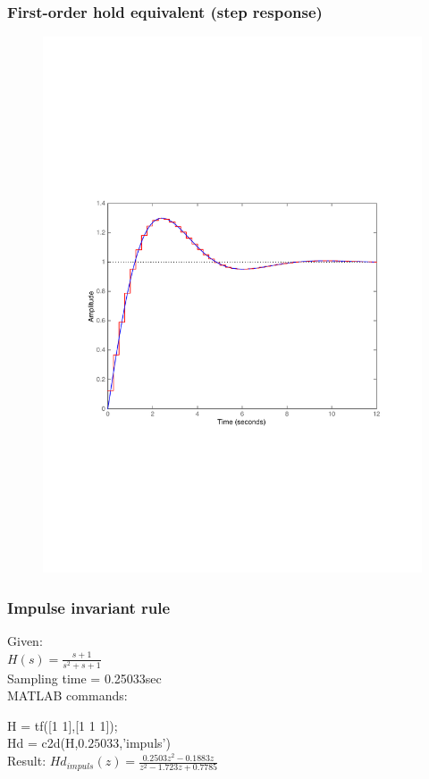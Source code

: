 \begin{frame}
	\frametitle{First-order hold equivalent (step response)}
	\vspace{-0.7em}
	\begin{figure}
		\centering
		\includegraphics[width=0.8\linewidth]{vb2}
	\end{figure}
\end{frame}

\begin{frame}
	\frametitle{Impulse invariant rule}
	\begin{example}
		Given:\\
		$H(s) = \frac{s + 1}{s^{2} + s + 1}$\\
		Sampling time = 0.25033sec\\
		\vspace{1em}
		MATLAB commands:
		
		H = tf([1 1],[1 1 1]); \\
		Hd = c2d(H,$0.25033$,'impuls')\\
		\vspace{1em}
		Result:
		$Hd_{impuls}(z) = \frac{0.2503z^{2} - 0.1883z}{z^{2} - 1.723z + 0.7785}$
	\end{example}
\end{frame}


